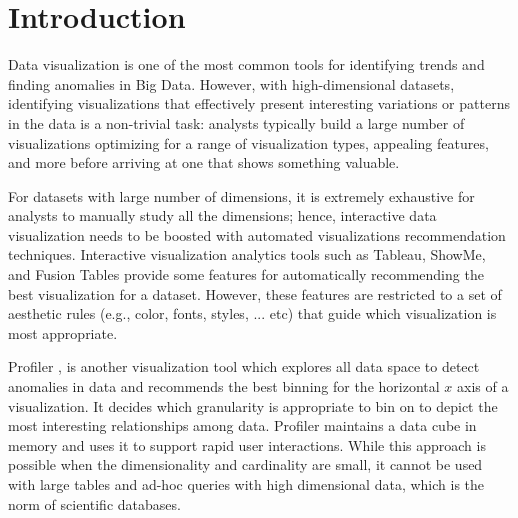 \section{Introduction}
\label{sec:intro}
%
Data visualization is one of the most common tools for identifying trends and finding anomalies in Big Data. 
%
However, with high-dimensional datasets, identifying visualizations that effectively present interesting variations or patterns in the data is a non-trivial task: analysts typically build a large number of visualizations optimizing for a range of visualization types, appealing features, and more before arriving at one that shows something valuable. 
%

For datasets with large number of dimensions, it is extremely exhaustive for analysts to manually study all the dimensions; hence, interactive data visualization needs to be boosted with automated visualizations recommendation techniques.
%
Interactive visualization analytics tools such as Tableau, ShowMe, and Fusion Tables \cite{DBLP:conf/sigmod/GonzalezHJLMSSG10,DBLP:journals/tvcg/MackinlayHS07,Stolte:2000:PSQ:857190.857686} provide some features for automatically recommending the best visualization for a dataset. However, these features are restricted to a set of aesthetic rules (e.g., color, fonts, styles, ... etc) that guide which visualization is most appropriate.
%
%
%
%
%

Profiler \cite{kandel2012profiler}, is another visualization tool which explores all data space to detect anomalies in data and recommends the best binning for the horizontal $x$ axis of a visualization. It decides which granularity is appropriate to bin on to depict the most interesting relationships among data.
%
%
%
%
%
Profiler \cite{kandel2012profiler} maintains a data cube in memory and uses it to support rapid user interactions.
%
While this approach is possible when the dimensionality and cardinality are small, it cannot be used with large tables and ad-hoc queries with high dimensional data, which is the norm of scientific databases.
%

